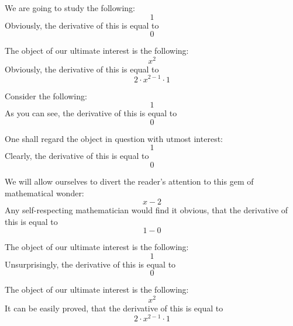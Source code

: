 \documentclass{article}
\begin{document}
We are going to study the following:
\begin{equation}
1 
\end{equation}
Obviously, the derivative of this is equal to
\begin{equation}
0 
\end{equation}

The object of our ultimate interest is the following:
\begin{equation}
x ^{2 } 
\end{equation}
Obviously, the derivative of this is equal to
\begin{equation}
2 \cdot x ^{2 - 1 } \cdot 1 
\end{equation}

Consider the following:
\begin{equation}
1 
\end{equation}
As you can see, the derivative of this is equal to
\begin{equation}
0 
\end{equation}

One shall regard the object in question with utmost interest:
\begin{equation}
1 
\end{equation}
Clearly, the derivative of this is equal to
\begin{equation}
0 
\end{equation}

We will allow ourselves to divert the reader's attention to this gem of mathematical wonder:
\begin{equation}
x - 2 
\end{equation}
Any self-respecting mathematician would find it obvious, that the derivative of this is equal to
\begin{equation}
1 - 0 
\end{equation}

The object of our ultimate interest is the following:
\begin{equation}
1 
\end{equation}
Unsurprisingly, the derivative of this is equal to
\begin{equation}
0 
\end{equation}

The object of our ultimate interest is the following:
\begin{equation}
x ^{2 } 
\end{equation}
It can be easily proved, that the derivative of this is equal to
\begin{equation}
2 \cdot x ^{2 - 1 } \cdot 1 
\end{equation}
\end{document}
